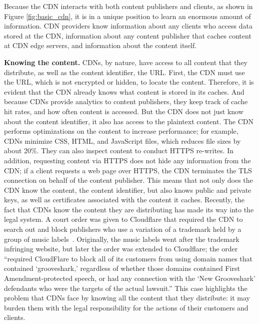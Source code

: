 Because the CDN interacts with both content publishers and clients, as shown in Figure \ref{fig:basic_cdn}, it is in a unique position 
to learn an enormous amount of information.  CDN providers know information about any clients who
access data stored at the CDN, information about any content publisher that caches content at 
CDN edge servers, and information about the content itself.

{\bf Knowing the content.}  CDNs, by nature, have access to all content that they distribute, as well as the 
content identifier, the URL.  First, the CDN must use the URL, which is not 
encrypted or hidden, to locate the content. Therefore, it is evident that the CDN already knows what content is 
stored in its caches.  And because CDNs provide analytics to content publishers, they keep track of cache hit 
rates, and how often content is accessed.  But the CDN does not just know about the content identifier, it also 
has access to the plaintext content.  The CDN performs optimizations on the content to increase performance; 
for example, CDNs minimize CSS, HTML, and JavaScript files, which reduces file sizes by about 20\%.  They can 
also inspect content to conduct HTTPS re-writes. In addition, requesting content via HTTPS does not hide any information 
from the CDN; if a client requests a web page over HTTPS, the CDN terminates the TLS connection on behalf of the 
content publisher.  This means that not only does the CDN know the content, the content identifier, but also knows 
public and private keys, as well as certificates associated with the content it caches.  Recently, the fact that CDNs 
know the content they are distributing has made its way into the legal system.  A court order was given to Cloudflare 
that required the CDN to search out and block publishers who use a variation of a trademark held by a group of 
music labels~\cite{eff_cloudflare_trademark}.  Originally, the music labels went after the trademark infringing 
website, but later the order was extended to Cloudflare; the order ``required CloudFlare to block all of its customers 
from using domain names that contained `grooveshark,' regardless of whether those domains contained First 
Amendment-protected speech, or had any connection with the `New Grooveshark' defendants who were the 
targets of the actual lawsuit.''  This case highlights the problem that CDNs face by knowing all the content 
that they distribute: it may burden them with the legal responsibility for the actions of their customers 
and clients.

